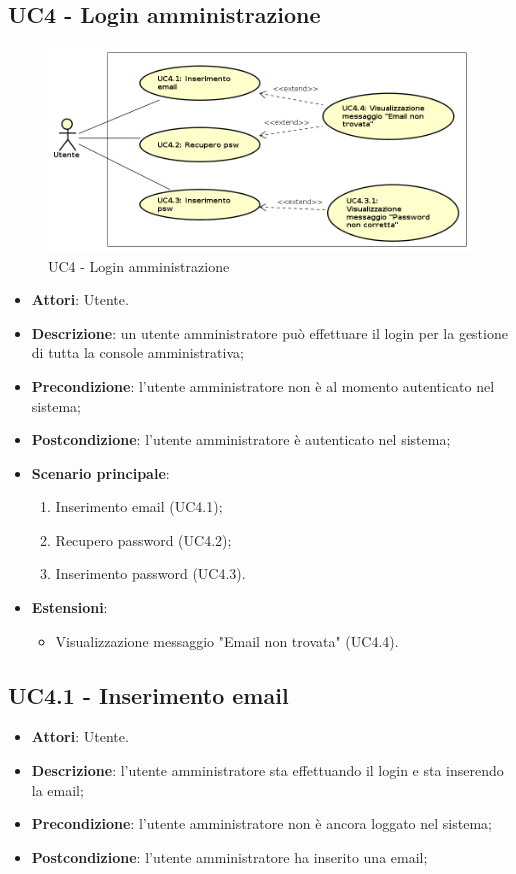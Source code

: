 \documentclass[../AnalisiDeiRequisiti.tex]{subfiles}
\begin{document}
\subsection{UC4 - Login amministrazione} 
\label{sssec:UC4} 
\begin{figure}[!h]
	\centering
	\includegraphics[width=\textwidth]{UseCases/UC4_LoginAmministrazione/UC4_LoginAmministrazione.png}
	\caption{UC4 - Login amministrazione}
\end{figure}
\begin{itemize} 
\item \textbf{Attori}: Utente.
\item \textbf{Descrizione}: un utente amministratore può effettuare il login per la gestione di tutta la console amministrativa;
\item \textbf{Precondizione}: l'utente amministratore non è al momento autenticato nel sistema;
\item \textbf{Postcondizione}: l'utente amministratore è autenticato nel sistema;
\item \textbf{Scenario principale}: \begin{enumerate}\item Inserimento email (UC4.1);\item Recupero password (UC4.2);\item Inserimento password (UC4.3). 
 \end{enumerate}
\item \textbf{Estensioni}:\begin{itemize}\item Visualizzazione messaggio "Email non trovata" (UC4.4).\end{itemize}
\end{itemize} 
\subsection{UC4.1 - Inserimento email} 
\label{sssec:UC4.1} 
\begin{itemize} 
\item \textbf{Attori}: Utente.
\item \textbf{Descrizione}: l'utente amministratore sta effettuando il login e sta inserendo la email;
\item \textbf{Precondizione}: l'utente amministratore non è ancora loggato nel sistema;
\item \textbf{Postcondizione}: l'utente amministratore ha inserito una email;
\end{itemize} 
\end{document}
